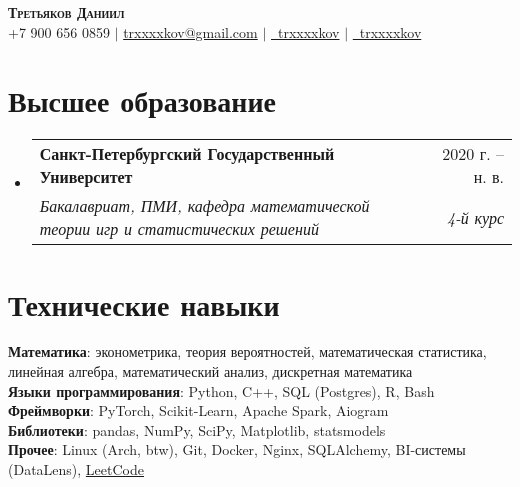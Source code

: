 \documentclass[a4paper, 11pt]{article}
\makeatletter
\newcommand{\resumeSubheading}[4]{
  \vspace{-2pt}\item
    \begin{tabular*}{0.97\textwidth}[t]{l@{\extracolsep{\fill}}r}
      \textbf{#1} & #2 \\
      \textit{\small#3} & \textit{\small #4} \\
    \end{tabular*}\vspace{-7pt}
}
\newcommand{\resumeSubHeadingListStart}{\begin{itemize}[leftmargin=0.15in, label={}]}
\newcommand{\resumeSubHeadingListEnd}{\end{itemize}}
\makeatother
\begin{document}
\begin{center}
    \textbf{\Huge \scshape Третьяков Даниил} \\ \vspace{5pt}
    \small +7 900 656 0859 $|$ \href{mailto:trxxxxkov@gmail.com}{trxxxxkov@gmail.com} $|$
    \href{https://t.me/trxxxxkov}{\faTelegram \ trxxxxkov} $|$  \href{https://github.com/trxxxxkov}{\faGithub \ trxxxxkov}
\end{center}


\section{Высшее образование}
  \resumeSubHeadingListStart
    \resumeSubheading
      {Санкт-Петербургский Государственный Университет}{2020 г. -- н. в.}
      {Бакалавриат, ПМИ, кафедра математической теории игр и статистических решений}
      {4-й курс}
  \resumeSubHeadingListEnd


\section{Технические навыки}
 \begin{itemize}[leftmargin=0.15in, label={}]
    \small{\item{
        \textbf{Математика}{: эконометрика, теория вероятностей, математическая статистика, линейная алгебра, математический анализ, дискретная математика} \\    
        \vspace{3pt}
        \textbf{Языки программирования}{: Python, C++, SQL (Postgres), R, Bash} \\
        \vspace{3pt}
        \textbf{Фреймворки}{: PyTorch, Scikit-Learn, Apache Spark, Aiogram} \\
        \vspace{3pt}
        \textbf{Библиотеки}{: pandas, NumPy, SciPy, Matplotlib, statsmodels} \\
        \vspace{3pt}
        \textbf{Прочее}{: Linux (Arch, btw), Git, Docker, Nginx, SQLAlchemy, BI-системы (DataLens), \href{https://leetcode.com/u/trxxxxkov/}{LeetCode}} \\
    }}
 \end{itemize}

\end{document}
